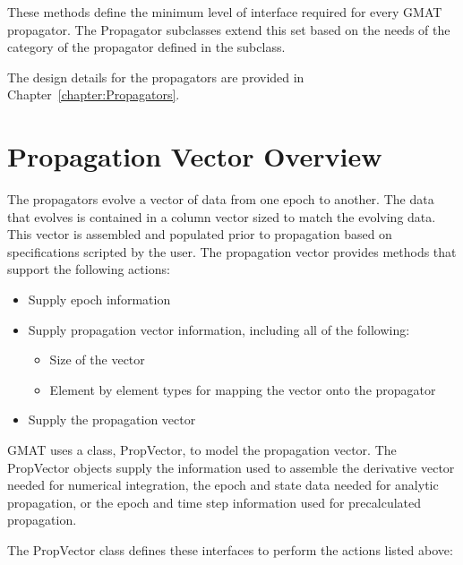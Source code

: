 \noindent These methods define the minimum level of interface required for every GMAT propagator.
The Propagator subclasses extend this set based on the needs of the category of the propagator
defined in the subclass.

The design details for the propagators are provided in Chapter~\ref{chapter:Propagators}.

\section{Propagation Vector Overview}

The propagators evolve a vector of data from one epoch to another.  The data that evolves is
contained in a column vector sized to match the evolving data.  This vector is assembled and
populated prior to propagation based on specifications scripted by the user.  The propagation
vector provides methods that support the following actions:

\begin{itemize}
\item Supply epoch information
\item Supply propagation vector information, including all of the following:
\begin{itemize}
\item Size of the vector
\item Element by element types for mapping the vector onto the propagator
\end{itemize}
\item Supply the propagation vector
\end{itemize}

\noindent GMAT uses a class, PropVector, to model the propagation vector.  The PropVector objects
supply the information used to assemble the derivative vector needed for numerical integration, the
epoch and state data needed for analytic propagation, or the epoch and time step information used
for precalculated propagation.

The PropVector class defines these interfaces to perform the actions listed above:

